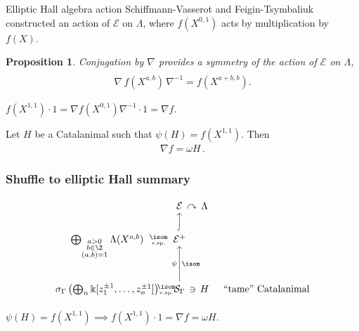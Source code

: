 \documentclass[dvipsnames]{beamer}
\newcommand{\Ecal}{\mathcal{E}}
\newcommand{\kk}{\Bbbk}
\newcommand{\Scal}{\mathcal{S}}
\newtheorem{prop}{Proposition}
\theoremstyle{definition}
\begin{document}
\begin{frame}{Elliptic Hall algebra action}
  Schiffmann-Vasserot and Feigin-Tsymbaliuk constructed an action of $\Ecal$ on  $\Lambda$,
where $f(X^{0,1})$ acts by multiplication by $f(X)$. \pause
\begin{prop}
  Conjugation by  $\nabla $ provides a symmetry of the
action of $\Ecal $ on $\Lambda$,
\begin{align*}
\\[-8mm]
\nabla\, f(X^{a,b})\, \nabla^{-1} = f(X^{a+b,b}).
\end{align*}
\end{prop} \pause
\begin{corollary}
  $f(X^{1,1})\cdot 1 = \nabla f(X^{0,1}) \nabla^{-1} \cdot 1 = \nabla f$.
\end{corollary} \pause
\begin{theorem}
Let $H$ be a Catalanimal such that  $\psi (H) = f(X^{1,1})$.
Then
\begin{align*}
\nabla f = \omega H \,.
\end{align*}
\end{theorem}
\end{frame}
\begin{frame}[fragile]
  \frametitle{Shuffle to elliptic Hall summary}
  \[
  \begin{tikzcd}[column sep=tiny]
    & \Ecal \ar[r, phantom, "\curvearrowright"] & \Lambda\\
    \bigoplus_{\substack{a > 0 \\ b \in \Z \\ (a,b)=1}} \Lambda(X^{a,b}) \ar[r,
    phantom, "\substack{\isom \\ \text{\tiny v.sp.}}"] &
    \Ecal^+  \ar[u, hookrightarrow]& \\
    \sigma_\Gamma\left( \bigoplus_n \kk[z_1^{\pm 1},\ldots, z_n^{\pm
        1}] \right) \ar[r, phantom, "\substack{\isom \\
      \text{\tiny v.sp.}}"]& \Scal_\Gamma \ar[u, "\psi", "\isom"'] & \ar[l,
    phantom, "\ni"] H & \text{``tame'' Catalanimal}
  \end{tikzcd}
  \]
  \begin{theorem}
    \(\psi(H) = f(X^{1,1}) \implies f(X^{1,1}) \cdot 1 = \nabla f =
    \omega H\).
  \end{theorem}
\end{frame}
\end{document}
